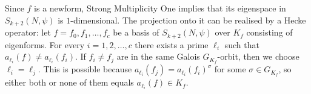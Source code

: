 \documentclass[10pt,a4paper]{amsart}
\begin{document}
\begin{list}{}
  {%
    \setlength{\leftmargin}{0pt}%
    \setlength{\labelwidth}{-0.25cm}%
    \setlength{\labelsep}{0.25cm}%
    \setlength{\itemsep}{0.5cm}
    \renewcommand{\makelabel}[1]{\textbf{#1}:\hfil}%
  }
    \item[Projection onto $f$-eigenspace] Since $f$ is a newform, Strong Multiplicity One implies that its eigenspace in $S_{k+2}(N,\psi)$ is $1$-dimensional. The projection onto it can be realised by a Hecke operator: let $f=f_0,f_1,\ldots,f_c$ be a basis of $S_{k+2}(N,\psi)$ over $K_f$ consisting of eigenforms. For every $i=1,2,\ldots,c$ there exists a prime $\ell_i$ such that $a_{\ell_i}(f) \neq a_{\ell_i}(f_i)$. If $f_i\neq f_j$ are in the same Galois $G_{K_f}$-orbit, then we choose $\ell_i=\ell_j$. This is possible because $a_{\ell_i}(f_j) = a_{\ell_i}(f_i)^{\sigma}$ for some $\sigma\in G_{K_f}$, so either both or none of them equals $a_{\ell_i}(f)\in K_f$.


\end{list}
\end{document}
